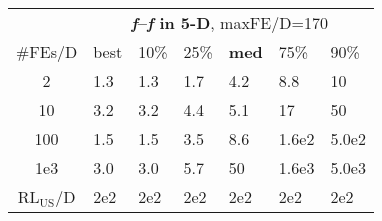 \begin{tabular}{c|llllll}
 & \multicolumn{6}{|c}{\textbf{\textit{f}\raisebox{-0.35ex}{1}--\textit{f}\raisebox{-0.35ex}{21} in 5-D}, maxFE/D=170}\\
\#FEs/D & best & 10\% & 25\% & \textbf{med} & 75\% & 90\%\\
2 & \hspace*{1ex}1.3 & \hspace*{1ex}1.3 & \hspace*{1ex}1.7 & \hspace*{1ex}4.2 & \hspace*{1ex}8.8 & 10\\
10 & \hspace*{1ex}3.2 & \hspace*{1ex}3.2 & \hspace*{1ex}4.4 & \hspace*{1ex}5.1 & 17 & 50\\
100 & \hspace*{1ex}1.5 & \hspace*{1ex}1.5 & \hspace*{1ex}3.5 & \hspace*{1ex}8.6 & 1.6e2 & 5.0e2\\
1e3 & \hspace*{1ex}3.0 & \hspace*{1ex}3.0 & \hspace*{1ex}5.7 & 50 & 1.6e3 & 5.0e3\\
$\text{RL}_{\text{US}}$/D & 2e2 & 2e2 & 2e2 & 2e2 & 2e2 & 2e2
\end{tabular}
